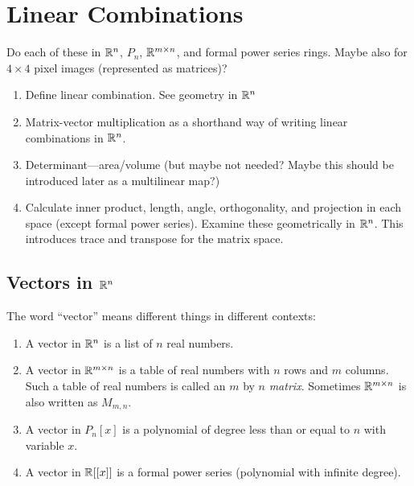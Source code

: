 \chapter{Linear Combinations}
Do each of these in $\mathbb{R}^n$, $P_n$, $\mathbb{R}^{m\times n}$, and formal power
  series rings.  Maybe also for $4\times 4$ pixel images (represented
  as matrices)?
\begin{enumerate}
\item Define linear combination.  See geometry in $\mathbb{R}^n$
\item Matrix-vector multiplication as a shorthand way of writing
  linear combinations in $\mathbb{R}^n$.
\item Determinant---area/volume (but maybe not needed?  Maybe this
  should be introduced later as a multilinear map?)
\item Calculate inner product, length, angle, orthogonality, and
  projection in each space (except formal power series).  Examine
  these geometrically in $\mathbb{R}^n$.  This introduces trace and transpose
  for the matrix space.
\end{enumerate}

\section{Vectors in $\mathbb{R}^n$}

\begin{definition}
  The word ``vector'' means different things in different contexts:
  \begin{enumerate}
  \item A vector in $\mathbb{R}^n$ is a list of $n$ real numbers.
  \item A vector in $\mathbb{R}^{m\times n}$ is a table of real numbers with
    $n$ rows and $m$ columns.  Such a table of real numbers is called
    an $m$ by $n$ \emph{matrix}.  Sometimes $\mathbb{R}^{m\times n}$ is also
    written as $M_{m,n}$.
  \item A vector in $P_n[x]$ is a polynomial of degree less than or equal
    to $n$ with variable $x$.
  \item A vector in $\mathbb{R}[[x]]$ is a formal power series (polynomial with
    infinite degree).
  \end{enumerate}
\end{definition}

